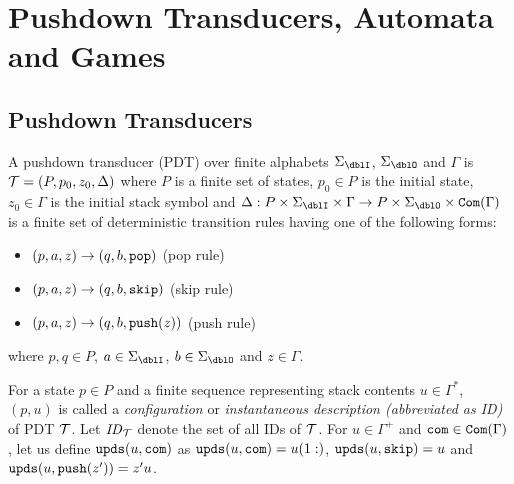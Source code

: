 \section{Pushdown Transducers, Automata and Games}
\subsection{Pushdown Transducers}
\begin{definition}
A {pushdown transducer} (PDT)
over finite alphabets $\Sigma_\dblI$, $\Sigma_\dblO$ and $\Gamma$
is ${\cal T}=(P, p_0, z_0, \Delta)$ where
$P$ is a finite set of states,
$p_0\in P$ is the initial state,
$z_0\in \Gamma$ is the initial stack symbol and
$\Delta: P\times \Sigma_\dblI \times \Gamma \to P\times \Sigma_\dblO \times \Com(\Gamma)$ is a finite set of deterministic transition rules having one of the following forms:
\begin{itemize}
\item $(p, a, z) \rightarrow (q, b, \mathtt{pop})$ \quad (pop rule)
\item $(p, a, z) \rightarrow (q, b, \mathtt{skip})$ \quad (skip rule)
\item $(p, a, z) \rightarrow (q, b, \mathtt{push}(z))$ \quad (push rule)
\end{itemize}
where $p, q\in P$, $a\in\Sigma_\dblI$, $b\in\Sigma_\dblO$ and $z\in\Gamma$.
\end{definition}
\noindent
For a state $p\in P$ and
a finite sequence representing stack contents $u \in \Gamma^*$,
$(p, u)$ is called
a {\em configuration} or {\em instantaneous description (abbreviated as ID)} of PDT ${\cal T}$. Let $\mathit{ID}_{\cal T}$ denote the set of all IDs of ${\cal T}$.
For $u\in\Gamma^+$ and $\mathtt{com}\in\mathtt{Com}(\Gamma)$, let us define $\mathtt{upds}(u,\mathtt{com})$
as $\mathtt{upds}(u,\mathtt{com})=u(1:)$, $\mathtt{upds}(u,\mathtt{skip})=u$ and $\mathtt{upds}(u,\mathtt{push}(z'))=z'u$.


